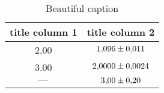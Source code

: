 \begin{table}
 \caption{Beautiful caption}
 \label{tab:important_label}
 \centering
{}
 \begin{tabular}{SS}
 \toprule 
    {title column 1}& {title column 2} \\
      & $\num{1.096\pm0.011}$ \\
           3.00 & $\num{2.0000\pm0.0024}$ \\
     $\text{\textbf{---}}$&$\num{3.00\pm0.20}$ \\
 \bottomrule
 \end{tabular}
\end{table}